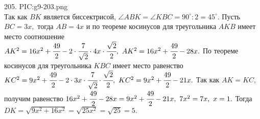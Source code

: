 205. {{PIC:g9-203.png}}\\
Так как $BK$ является биссектрисой, $\angle ABK=\angle KBC=90^\circ:2=45^\circ.$ Пусть $BC=3x,$ тогда $AB=4x$ и по теореме косинусов для треугольника $AKB$ имеет место соотношение $AK^2=16x^2+\cfrac{49}{2}-2\cdot\cfrac{7}{\sqrt{2}}\cdot 4x\cdot \cfrac{\sqrt{2}}{2},\ AK^2=16x^2+\cfrac{49}{2}-28x.$ По теореме косинусов для треугольника $KBC$ имеет место равенство $KC^2=9x^2+\cfrac{49}{2}-2\cdot 3x\cdot\cfrac{7}{\sqrt{2}}\cdot \cfrac{\sqrt{2}}{2},\ KC^2=9x^2+\cfrac{49}{2}-21x.$ Так как $AK=KC,$ получим равенство $16x^2+\cfrac{49}{2}-28x=9x^2+\cfrac{49}{2}-21x,\ 7x^2=7x,\ x=1.$ Тогда $DK=\sqrt{9x^2+16x^2}=\sqrt{25x^2}=\sqrt{25}=5.$\\
